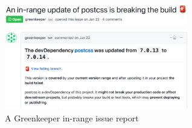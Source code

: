 \begin{figure}[h]
    \centering
    \includegraphics[width=8cm]{images/gk_issue.png}
    \caption{A Greenkeeper in-range issue report}
    \label{fig:gk_issue_report}
\end{figure}